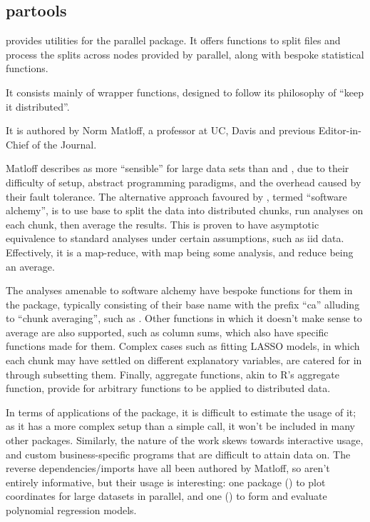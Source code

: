 \subsection{partools}\label{subsec:partools}

 provides utilities for the parallel
package\cite{matloff16softw_alchemy}.
It offers functions to split files and process the splits across nodes provided by parallel, along with bespoke statistical functions.

It consists mainly of wrapper functions, designed to follow its philosophy of ``keep it distributed''.

It is authored by Norm Matloff, a professor at UC, Davis and previous Editor-in-Chief of the \R{} Journal.

Matloff describes  as more ``sensible'' for large data sets than  and , due to their difficulty of setup, abstract programming paradigms, and the overhead caused by their fault tolerance.
The alternative approach favoured by , termed ``software alchemy'', is to use base \R{} to split the data into distributed chunks, run analyses on each chunk, then average the results.
This is proven to have asymptotic equivalence to standard analyses under certain assumptions, such as iid data.
Effectively, it is a map-reduce, with map being some analysis, and reduce being an average.

The analyses amenable to software alchemy have bespoke functions for them in the package, typically consisting of their base \R{} name with the prefix ``ca'' alluding to ``chunk averaging'', such as .
Other functions in which it doesn't make sense to average are also supported, such as column sums, which also have specific functions made for them.
Complex cases such as fitting LASSO models, in which each chunk may have settled on different explanatory variables, are catered for in  through subsetting them.
Finally, aggregate functions, akin to R's aggregate function, provide for arbitrary functions to be applied to distributed data.

In terms of applications of the package, it is difficult to estimate the usage of it; as it has a more complex setup than a simple  call, it won't be included in many other packages.
Similarly, the nature of the work skews towards interactive usage, and custom business-specific programs that are difficult to attain data on.
The reverse dependencies/imports have all been authored by Matloff, so aren't entirely informative, but their usage is interesting: one package () to plot coordinates for large datasets in parallel, and one () to form and evaluate polynomial regression models.

